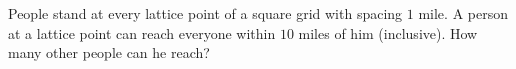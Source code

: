 People stand at every lattice point of a square grid with spacing $1$ mile. A person at a lattice point can reach everyone within $10$ miles of him (inclusive). How many other people can he reach?
